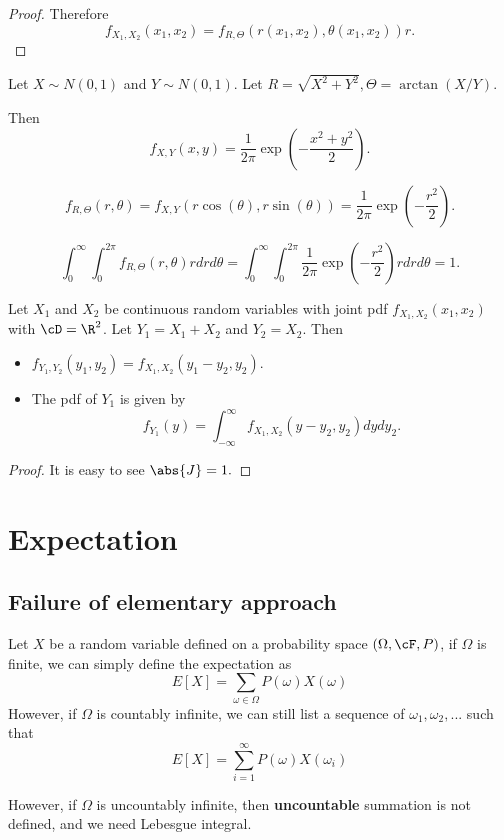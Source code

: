 \begin{refsection}
\begin{proof}
Therefore
$$f_{X_1,X_2}(x_1,x_2) = f_{R,\Theta}(r(x_1,x_2),\theta(x_1,x_2))r.$$	
\end{proof}




\begin{example}
Let $X \sim N(0,1)$ and $Y \sim N(0,1)$.  Let $R = \sqrt{X^2 + Y^2}, \Theta = \arctan (X/Y)$.

Then
$$f_{X,Y}(x,y) = \frac{1}{2\pi}\exp(-\frac{x^2+y^2}{2}).$$

$$f_{R,\Theta}(r,\theta) = f_{X,Y}(r\cos(\theta),r\sin(\theta)) = \frac{1}{2\pi}\exp(-\frac{r^2}{2}).$$

$$ \int_0^\infty \int_0^{2\pi} f_{R,\Theta}(r,\theta)rdrd\theta = \int_0^\infty \int_0^{2\pi} \frac{1}{2\pi}\exp(-\frac{r^2}{2})rdrd\theta = 1.$$
\end{example}

\begin{lemma}\cite[95]{hoggintroduction}
	Let $X_1$ and $X_2$	be continuous random variables with joint pdf $f_{X_1,X_2}(x_1,x_2)$ with $\cD = \R^2$. Let $Y_1=X_1+X_2$ and $Y_2 = X_2.$
	Then
	\begin{itemize}
		\item $f_{Y_1,Y_2}(y_1,y_2) = f_{X_1,X_2}(y_1-y_2,y_2).$
		\item The pdf of $Y_1$ is given by
		$$f_{Y_1}(y) = \int_{-\infty}^{\infty} f_{X_1,X_2}(y-y_2,y_2) dydy_2.$$
	\end{itemize}
\end{lemma}
\begin{proof}
It is easy to see $\abs{J}=1.$
\end{proof}

\section{Expectation}
\subsection{Failure of elementary approach}
Let $X$ be a random variable defined on a probability space $(\Omega,\cF,P)$, if $\Omega$ is finite, we can simply define the expectation as
$$E[X]=\sum_{\omega \in \Omega} P(\omega) X(\omega)$$
However, if $\Omega$ is countably infinite, we can still list a sequence of $\omega_1,\omega_2,...$ such that
$$E[X]=\sum_{i=1}^\infty P(\omega) X(\omega_i)$$

However, if $\Omega$ is uncountably infinite, then \textbf{uncountable} summation is not defined, and we need Lebesgue integral. 


\end{refsection}
